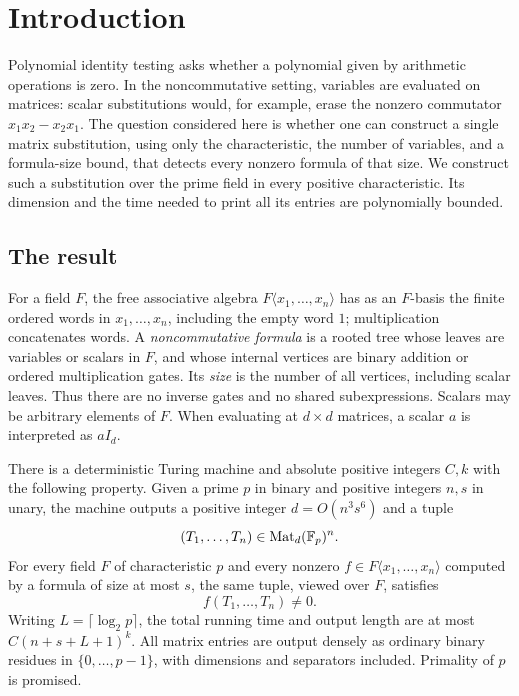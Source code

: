 \section{Introduction}\label{sec:introduction}

Polynomial identity testing asks whether a polynomial given by arithmetic
operations is zero. In the noncommutative setting, variables are evaluated
on matrices: scalar substitutions would, for example, erase the nonzero
commutator $x_1x_2-x_2x_1$. The question considered here is whether one can
construct a single matrix substitution, using only the characteristic, the
number of variables, and a formula-size bound, that detects every nonzero
formula of that size.
We construct such a substitution over the prime field in every positive
characteristic. Its dimension and the time needed to print all its entries
are polynomially bounded.

\subsection{The result}

For a field $F$, the free associative algebra
$F\langle x_1,\ldots,x_n\rangle$ has as an $F$-basis the finite ordered
words in $x_1,\ldots,x_n$, including the empty word $1$; multiplication
concatenates words. A \emph{noncommutative formula} is a rooted tree whose
leaves are variables or scalars in $F$, and whose internal vertices are
binary addition or ordered multiplication gates. Its \emph{size} is the
number of all vertices, including scalar leaves. Thus there are no inverse
gates and no shared subexpressions. Scalars may be arbitrary elements of $F$.
When evaluating at $d\times d$ matrices, a scalar $a$ is interpreted as $aI_d$.

\begin{theorem}\label{thm:main}
There is a deterministic Turing machine and absolute positive integers $C,k$ with
the following property. Given a prime $p$ in binary and positive integers
$n,s$ in unary, the machine outputs a positive integer $d=O(n^3s^6)$ and
a tuple
\[
 (T_1,\ldots,T_n)\in\operatorname{Mat}_d(\mathbb F_p)^n.
\]
For every field $F$ of characteristic $p$ and every nonzero
$f\in F\langle x_1,\ldots,x_n\rangle$ computed by a formula of size at
most $s$, the same tuple, viewed over $F$, satisfies
\[
 f(T_1,\ldots,T_n)\ne0.
\]
Writing $L=\lceil\log_2p\rceil$, the total running time and output length
are at most $C(n+s+L+1)^k$. All matrix entries are output densely as ordinary
binary residues in $\{0,\ldots,p-1\}$, with dimensions and separators included.
Primality of $p$ is promised.
\end{theorem}

